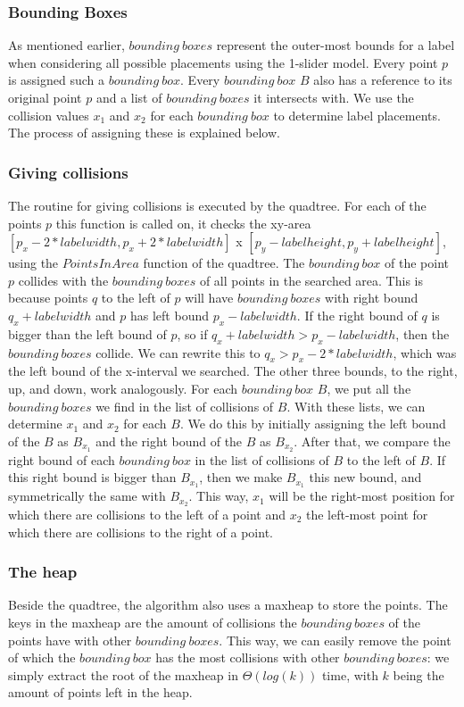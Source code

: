 \documentclass[crop=false,a4paper,oneside,11pt]{article}
\begin{document}
\subsubsection{Bounding Boxes}
As mentioned earlier, $bounding \ boxes$ represent the outer-most bounds for a label when considering all possible placements using the 1-slider model. Every point $p$ is assigned such a $bounding \ box$. Every $bounding \ box$ $B$ also has a reference to its original point $p$ and a list of $bounding \ boxes$ it intersects with. We use the collision values $x_1$ and $x_2$ for each $bounding \ box$ to determine label placements. The process of assigning these is explained below.

\subsubsection{Giving collisions}
The routine for giving collisions is executed by the quadtree. For each of the points $p$ this function is called on, it checks the xy-area $[p_x - 2*labelwidth, p_x + 2*labelwidth]$ x $[p_y - labelheight, p_y + labelheight]$, using the $PointsInArea$ function of the quadtree. The $bounding \ box$ of the point $p$ collides with the $bounding \ boxes$ of all points in the searched area. This is because points $q$ to the left of $p$ will have $bounding \ boxes$ with right bound $q_x + labelwidth$ and $p$ has left bound $p_x - labelwidth$. If the right bound of $q$ is bigger than the left bound of $p$, so if $q_x + labelwidth > p_x - labelwidth$, then the $bounding \ boxes$ collide. We can rewrite this to $q_x > p_x - 2*labelwidth$, which was the left bound of the x-interval we searched. The other three bounds, to the right, up, and down, work analogously. For each $bounding \ box$ $B$, we put all the $bounding \ boxes$ we find in the list of collisions of $B$. With these lists, we can determine $x_1$ and $x_2$ for each $B$. We do this by initially assigning the left bound of the $B$ as $B_{x_1}$ and the right bound of the $B$ as $B_{x_2}$. After that, we compare the right bound of each $bounding \ box$ in the list of collisions of $B$ to the left of $B$. If this right bound is bigger than $B_{x_1}$, then we make $B_{x_1}$ this new bound, and symmetrically the same with $B_{x_2}$. This way, $x_1$ will be the right-most position for which there are collisions to the left of a point and $x_2$ the left-most point for which there are collisions to the right of a point.

\subsubsection{The heap}
Beside the quadtree, the algorithm also uses a maxheap to store the points. The keys in the maxheap are the amount of collisions the $bounding \ boxes$ of the points have with other $bounding \ boxes$. This way, we can easily remove the point of which the $bounding \ box$ has the most collisions with other $bounding \ boxes$: we simply extract the root of the maxheap in $\Theta(log (k))$ time, with $k$ being the amount of points left in the heap. 
\end{document}
